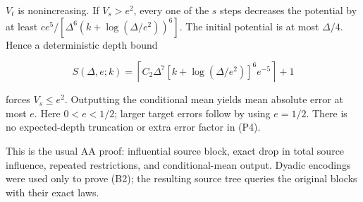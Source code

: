 \(V_t\) is nonincreasing. If \(V_s>e^2\), every one of the \(s\) steps
decreases the potential by at least
\(ce^5/[\Delta^6(k+\log(\Delta/e^2))^6]\). The initial potential is at
most \(\Delta/4\). Hence a deterministic depth bound

\[
 S(\Delta,e;k)
 =\left\lceil
 C_2\Delta^7[k+\log(\Delta/e^2)]^6 e^{-5}
 \right\rceil+1
 \tag{P4}
\]

forces \(V_s\le e^2\). Outputting the conditional mean yields mean
absolute error at most \(e\). Here \(0<e<1/2\); larger target errors
follow by using \(e=1/2\). There is no expected-depth truncation or
extra error factor in (P4).

This is the usual AA proof: influential source block, exact drop in
total source influence, repeated restrictions, and conditional-mean
output. Dyadic encodings were used only to prove (B2); the resulting
source tree queries the original blocks with their exact laws.
